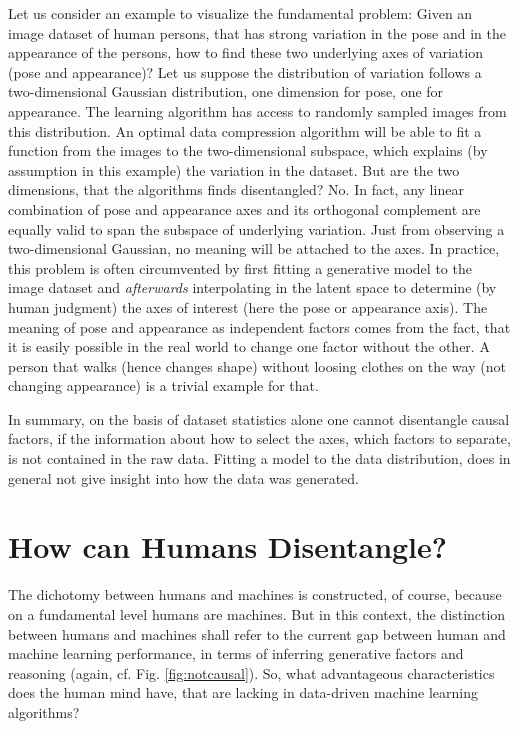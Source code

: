 	Let us consider an example to visualize the fundamental problem: Given an image dataset of human persons, that has strong variation in the pose and in the appearance of the persons, how to find these two underlying axes of variation (pose and appearance)? Let us suppose the distribution of variation follows a two-dimensional Gaussian distribution, one dimension for pose, one for appearance.
	The learning algorithm has access to randomly sampled images from this distribution. An optimal data compression algorithm will be able to fit a function from the images to the two-dimensional subspace, which explains (by assumption in this example) the variation in the dataset.
	But are the two dimensions, that the algorithms finds disentangled? No. In fact, any linear combination of pose and appearance axes and its orthogonal complement are equally valid to span the subspace of underlying variation. Just from observing a two-dimensional Gaussian, no meaning will be attached to the axes. In practice, this problem is often circumvented by first fitting a generative model to the image dataset and \textit{afterwards} interpolating in the latent space to determine (by human judgment) the axes of interest (here the pose or appearance axis). The meaning of pose and appearance as independent factors comes from the fact, that it is easily possible in the real world to change one factor without the other. A person that walks (hence changes shape) without loosing clothes on the way (not changing appearance) is a trivial example for that.

	In summary, on the basis of dataset statistics alone one cannot disentangle causal factors, if the information about how to select the axes, \ie which factors to separate, is not contained in the raw data.
	Fitting a model to the data distribution, does in general not give insight into how the data was generated.

\section{How can Humans Disentangle?}

	The dichotomy between humans and machines is constructed, of course, because on a fundamental level humans are machines.
	But in this context, the distinction between humans and machines shall refer to the current gap between human and machine learning performance, in terms of inferring generative factors and reasoning (again, cf. Fig. \ref{fig:notcausal}).
	So, what advantageous characteristics does the human mind have, that are lacking in data-driven machine learning algorithms?

